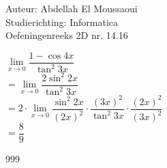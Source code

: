 \documentclass[a4paper]{article}
\begin{document}
  
\noindent \large Auteur: Abdellah El Moussaoui \\
\noindent \large Studierichting: Informatica\\
\noindent \large Oefeningenreeks 2D nr. 14.16\\

\medskip

\normalsize


$\lim\limits_{x\to0} \dfrac{1-\cos 4x}{\tan^2 3x}$\\

$=\lim\limits_{x\to0} \dfrac{2\sin^2 2x}{\tan^2 3x}$\\

$=2 \cdot \lim\limits_{x\to0} \dfrac{\sin^2 2x}{\left(2x\right)^2} \cdot \dfrac{\left(3x\right)^2}{\tan^2 3x} \cdot \dfrac{\left(2x\right)^2}{\left(3x\right)^2}$\\

$= \dfrac{8}{9}$

\begin{thebibliography}{999}
\end{thebibliography}
\end{document}
